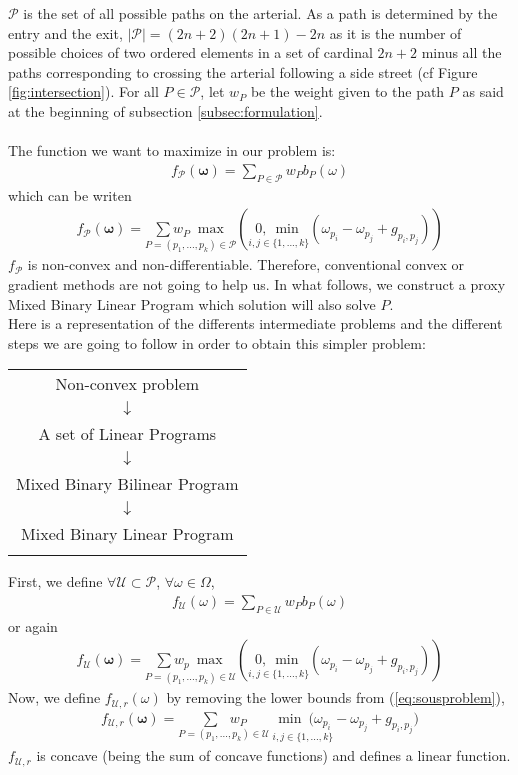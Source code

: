 $\mathcal{P}$ is the set of all possible paths on the arterial. As a path is determined by the entry and the exit, $|\mathcal{P}| = (2n+2)(2n+1) - 2n$ as it is the number of possible choices of two ordered elements in a set of cardinal $2n+2$ minus all the paths corresponding to crossing the arterial following a side street (cf Figure \ref{fig:intersection}). For all $P \in \mathcal{P}$, let $w_P$ be the weight given to the path $P$ as said at the beginning of subsection \ref{subsec:formulation}.\\ \\
The function we want to maximize in our problem is:
\begin{align}
f_{\mathcal{P}}  (\mathbf{\omega}) = \sum_{P \in \mathcal{P}} w_{P} b_P(\omega)
\end{align}
which can be writen
\begin{align}
f_{\mathcal{P}} (\mathbf{\omega}) = \underset{P = (p_1,...,p_k) \in \mathcal{P}}{\sum w_P \; \max}(\underset{i,j\in\{1,...,k\}}{0,~ \min}(\omega_{p_i}-\omega_{p_j}+g_{p_i,p_j}))
\end{align}
$f_\mathcal{P}$ is non-convex and non-differentiable. Therefore, conventional convex or gradient methods are not going to help us. In what follows, we construct a proxy Mixed Binary Linear Program which solution will also solve $P$.\\
Here is a representation of the differents intermediate problems and the different steps we are going to follow in order to obtain this simpler problem:\\
\begin{center}
\begin{tabular}{c}
Non-convex problem\\
$\downarrow$\\
A set of Linear Programs\\
$\downarrow$\\
Mixed Binary Bilinear Program\\
$\downarrow$\\
Mixed Binary Linear Program\\
\\
\end{tabular}
\end{center}
First, we define $\forall \mathcal{U} \subset \mathcal{P}$, $\forall \omega \in \Omega$, 
\begin{align}
f_{\mathcal{U}} (\omega) = \sum_{P \in \mathcal{U}} w_P b_P(\omega)
\end{align}
or again
\begin{align}
f_{\mathcal{U}} (\mathbf{\omega}) = \underset{P = (p_1,...,p_k) \in \mathcal{U}}{\sum w_p ~ \max}(\underset{i,j\in\{1,...,k\}}{0,~ \min}(\omega_{p_i}-\omega_{p_j}+g_{p_i,p_j}))
\label{eq:sousproblem}
\end{align}
Now, we define $f_{\mathcal{U},r} (\omega)$ by removing the lower bounds from (\ref{eq:sousproblem}),
\begin{align}
f_{\mathcal{U},r} (\mathbf{\omega}) = \underset{P = (p_1,...,p_k) \in \mathcal{U}}{\sum ~~~ w_P} ~\underset{i,j\in\{1,...,k\}}{\min~(\omega_{p_i}}-\omega_{p_j}+g_{p_i,p_j})
\end{align}
$f_{\mathcal{U},r}$ is concave (being the sum of concave functions) and defines a linear function.

